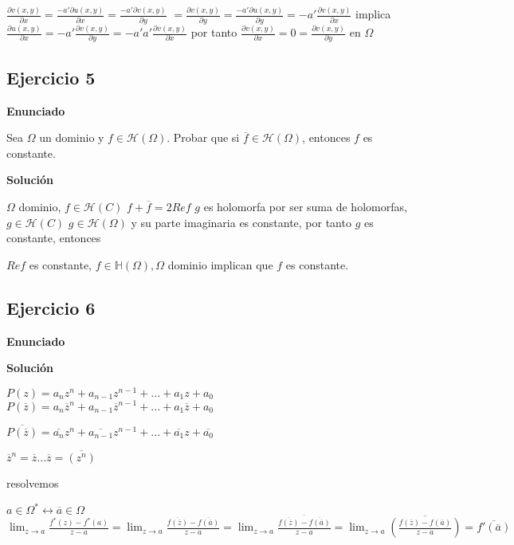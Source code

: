 $\frac{\partial v(x,y)}{\partial x} = \frac{-a' \partial u(x,y)}{\partial x} = \frac{-a' \partial v(x,y)}{\partial y}$
$= \frac{\partial v(x,y)}{\partial y} = \frac{-a' \partial u(x,y)}{\partial y} = -a' \frac{\partial v(x,y)}{\partial x}$
implica
$\frac{\partial u (x,y)}{\partial x} = -a'\frac{\partial v(x,y)}{\partial y} = -a'a'\frac{\partial v(x,y)}{\partial x}$
por tanto
$\frac{\partial v(x,y)}{\partial x} = 0 = \frac{\partial v(x,y)}{\partial y}$ en $\Omega$


\subsection{Ejercicio 5}
\textbf{Enunciado}

Sea $\Omega$ un dominio y $f\in\mathcal{H}(\Omega)$. Probar que si $\overline{f}\in\mathcal{H}(\Omega)$, entonces $f$ es constante.

\textbf{Solución}

$\Omega$ dominio, $f\in\mathcal{H}(C)$
$f+\overline{f} = 2Re f$
$g$ es holomorfa por ser suma de holomorfas, $g\in\mathcal{H}(C)$
$g\in\mathcal{H}(\Omega)$ y su parte imaginaria es constante, por tanto $g$ es constante, entonces

$Re f$ es constante, $f\in\mathbb{H}(\Omega), \Omega$ dominio implican que $f$ es constante.


\subsection{Ejercicio 6}
\textbf{Enunciado}





\textbf{Solución}

$P(z) = a_n z^n + a_{n-1}z^{n-1}+...+a_1z + a_0$
$P(\overline{z}) = a_n \overline{z}^n + a_{n-1}\overline{z}^{n-1}+...+a_1\overline{z} + a_0 $

$\overline{ P(\overline{z}) } = \overline{a_n}z^n + \overline{a_{n-1}}z^{n-1}+...+\overline{a_1}z + \overline{a_0}$

$\overline{z}^n  = \overline{z} ... \overline{z} = \overline{(z^n)}$


resolvemos

$a\in\Omega^{\ast} \longleftrightarrow \overline{a}\in\Omega$
$\lim_{z\rightarrow a} \frac{f^{\ast}(z)-f^{\ast}(a)}{z-a} = \lim_{z\rightarrow a} \frac{\overline{f(\overline{z})} - \overline{f(\overline{a})}}{z-a} =
 \lim_{z\rightarrow a} \frac{\overline{\overline{f(\overline{z})} - \overline{f(\overline{a})}}}{z-a} =
 \lim_{z\rightarrow a} \overline{\left( \frac{f(\overline{z})-f(\overline{a})}{z-a} \right)} =
 \overline{f'(\overline{a})}$


